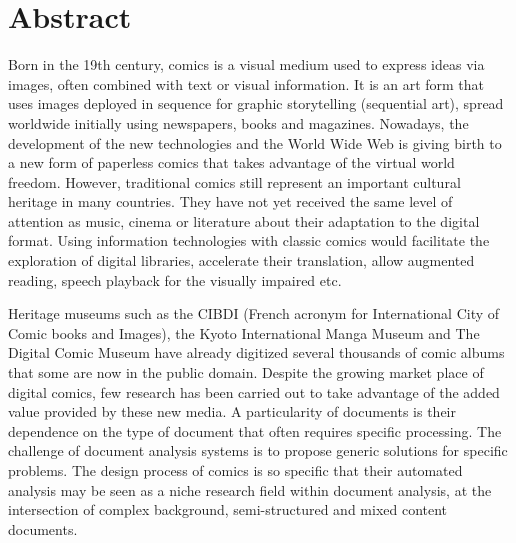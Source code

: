 \chapter*{Abstract}


Born in the 19th century, comics is a visual medium used to express ideas via images, often combined with text or visual information.
It is an art form that uses images deployed in sequence for graphic storytelling (sequential art), spread worldwide initially using newspapers, books and magazines.
Nowadays, the development of the new technologies and the World Wide Web is giving birth to a new form of paperless comics that takes advantage of the virtual world freedom.
However, traditional comics still represent an important cultural heritage in many countries.
They have not yet received the same level of attention as music, cinema or literature about their adaptation to the digital format.
Using information technologies with classic comics would facilitate the exploration of digital libraries, accelerate their translation, allow augmented reading, speech playback for the visually impaired etc.

Heritage museums such as the CIBDI (French acronym for International City of Comic books and Images), the Kyoto International Manga Museum and The Digital Comic Museum have already digitized several thousands of comic albums that some are now in the public domain.
Despite the growing market place of digital comics, few research has been carried out to take advantage of the added value provided by these new media.
A particularity of documents is their dependence on the type of document that often requires specific processing.
The challenge of document analysis systems is to propose generic solutions for specific problems.
The design process of comics is so specific that their automated analysis may be seen as a niche research field within document analysis, at the intersection of complex background, semi-structured and mixed content documents.

